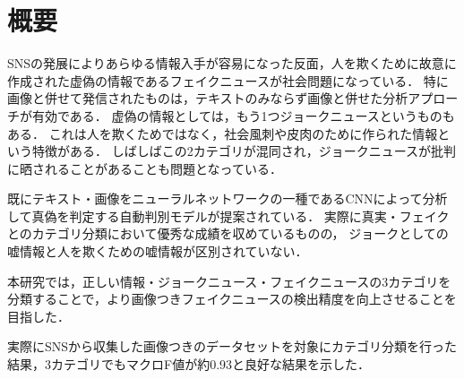 \chapter{概要}

SNSの発展によりあらゆる情報入手が容易になった反面，人を欺くために故意に作成された虚偽の情報であるフェイクニュースが社会問題になっている．
特に画像と併せて発信されたものは，テキストのみならず画像と併せた分析アプローチが有効である．
虚偽の情報としては，もう1つジョークニュースというものもある．
これは人を欺くためではなく，社会風刺や皮肉のために作られた情報という特徴がある．
しばしばこの2カテゴリが混同され，ジョークニュースが批判に晒されることがあることも問題となっている．

既にテキスト・画像をニューラルネットワークの一種であるCNNによって分析して真偽を判定する自動判別モデルが提案されている．
実際に真実・フェイクとのカテゴリ分類において優秀な成績を収めているものの，
ジョークとしての嘘情報と人を欺くための嘘情報が区別されていない．


本研究では，正しい情報・ジョークニュース・フェイクニュースの3カテゴリを分類することで，より画像つきフェイクニュースの検出精度を向上させることを目指した．


実際にSNSから収集した画像つきのデータセットを対象にカテゴリ分類を行った結果，3カテゴリでもマクロF値が約0.93と良好な結果を示した．


%